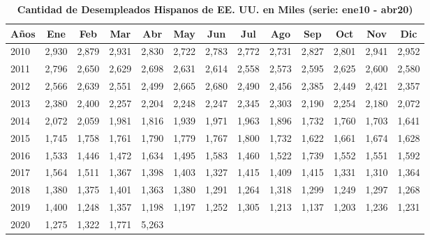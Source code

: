 \begin{table}[H]
	\centering
	\caption{\textbf{Cantidad de Desempleados Hispanos de EE. UU. en Miles (serie: ene10 - abr20) }}
	\label{Tabla 3}
	\resizebox{17cm}{!} { 
		\begin{tabular}{lcccccccccccc} \toprule			
			\textbf{Años}	&	\textbf{Ene}	&	\textbf{Feb}	&	\textbf{Mar}	&	\textbf{Abr}	&	\textbf{May}	&	\textbf{Jun}	&	\textbf{Jul}	&	\textbf{Ago}	&	\textbf{Sep}	&	\textbf{Oct}	&\textbf{	Nov}	&\textbf{	Dic}	\\  \midrule
			2010	&	2,930	&	2,879	&	2,931	&	2,830	&	2,722	&	2,783	&	2,772	&	2,731	&	2,827	&	2,801	&	2,941	&	2,952	\\ 
			2011	&	2,796	&	2,650	&	2,629	&	2,698	&	2,631	&	2,614	&	2,558	&	2,573	&	2,595	&	2,625	&	2,600	&	2,580	\\ 
			2012	&	2,566	&	2,639	&	2,551	&	2,499	&	2,665	&	2,680	&	2,490	&	2,456	&	2,385	&	2,449	&	2,421	&	2,357	\\ 
			2013	&	2,380	&	2,400	&	2,257	&	2,204	&	2,248	&	2,247	&	2,345	&	2,303	&	2,190	&	2,254	&	2,180	&	2,072	\\ 
			2014	&	2,072	&	2,059	&	1,981	&	1,816	&	1,939	&	1,971	&	1,963	&	1,896	&	1,732	&	1,760	&	1,703	&	1,641	\\ 
			2015	&	1,745	&	1,758	&	1,761	&	1,790	&	1,779	&	1,767	&	1,800	&	1,732	&	1,622	&	1,661	&	1,674	&	1,628	\\ 
			2016	&	1,533	&	1,446	&	1,472	&	1,634	&	1,495	&	1,583	&	1,460	&	1,522	&	1,739	&	1,552	&	1,551	&	1,592	\\ 
			2017	&	1,564	&	1,511	&	1,367	&	1,398	&	1,403	&	1,327	&	1,415	&	1,409	&	1,415	&	1,331	&	1,310	&	1,364	\\ 
			2018	&	1,380	&	1,375	&	1,401	&	1,363	&	1,380	&	1,291	&	1,264	&	1,318	&	1,299	&	1,249	&	1,297	&	1,268	\\ 
			2019	&	1,400	&	1,248	&	1,357	&	1,198	&	1,197	&	1,252	&	1,305	&	1,213	&	1,137	&	1,203	&	1,236	&	1,231	\\ 
			2020	&	1,275	&	1,322	&	1,771	&	5,263	&		&		&		&		&		&		&		&		\\  \bottomrule
			
			
		\end{tabular} 
		
	}
	{\small {}}
	
\end{table}


